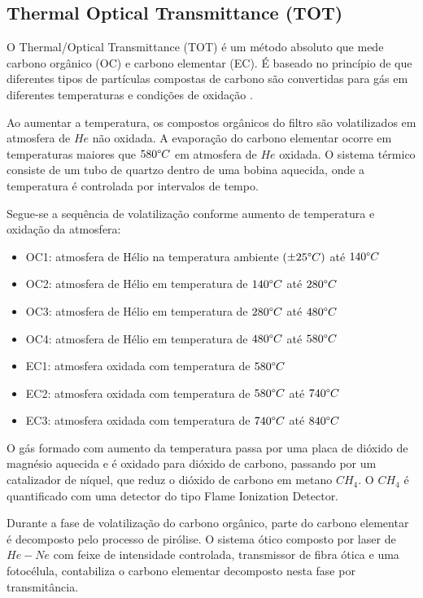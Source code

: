 \subsection{Thermal Optical Transmittance (TOT)}

O Thermal/Optical Transmittance (TOT) é um método absoluto
que mede carbono orgânico (OC) e carbono elementar (EC).
É baseado no princípio  de que diferentes tipos de partículas
compostas de carbono são convertidas para gás em diferentes temperaturas e
condições de oxidação \citep{birch1998}.

Ao aumentar a temperatura, os compostos orgânicos do filtro são volatilizados 
em atmosfera de $He$ não oxidada.
A evaporação do carbono elementar ocorre em temperaturas maiores que 
$580 \degree C$ em atmosfera de $He$ oxidada.
O sistema térmico consiste de um tubo de quartzo dentro de uma bobina aquecida, 
onde a temperatura é controlada por intervalos de tempo.  

Segue-se a sequência de volatilização conforme aumento de temperatura e 
oxidação da atmosfera:

\begin{itemize}
  \item OC1: atmosfera de Hélio na temperatura ambiente $(\pm 25 \degree C)$ até $140 \degree C$
  \item OC2: atmosfera de Hélio em temperatura de $140 \degree C$ até $280 \degree C$
  \item OC3: atmosfera de Hélio em temperatura de $280 \degree C$ até $480 \degree C$
  \item OC4: atmosfera de Hélio em temperatura de $480 \degree C$ até $580 \degree C$
  \item EC1: atmosfera oxidada com temperatura de $580 \degree C$
  \item EC2: atmosfera oxidada com temperatura de $580 \degree C$ até $740 \degree C$
  \item EC3: atmosfera oxidada com temperatura de $740 \degree C$ até $840 \degree C$
\end{itemize}

O gás formado com aumento da temperatura passa por uma placa de dióxido de magnésio 
aquecida e é oxidado para dióxido de carbono, passando por um catalizador de níquel, 
que reduz o dióxido de carbono em metano $CH_4$.
O $CH_4$ é quantificado com uma detector do tipo 
Flame Ionization Detector.

Durante a fase de volatilização do carbono orgânico, parte do carbono elementar
é decomposto pelo processo de pirólise. 
O sistema ótico composto por laser de $He-Ne$ com feixe de intensidade controlada, 
transmissor de fibra ótica e uma fotocélula, contabiliza o carbono elementar
decomposto nesta fase por transmitância.

